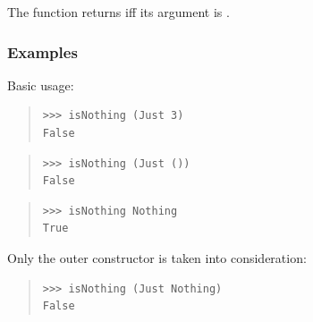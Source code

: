 \begin{haddockdesc}
\item[\begin{tabular}{@{}l}
isNothing :: Maybe a -> Bool
\end{tabular}]
{\haddockbegindoc
The  function returns  iff its argument is .\par
\subsubsection*{\textbf{Examples}}
Basic usage:\par
\begin{quote}
{\haddockverb\begin{verbatim}
>>> isNothing (Just 3)
False

\end{verbatim}}
\end{quote}
\begin{quote}
{\haddockverb\begin{verbatim}
>>> isNothing (Just ())
False

\end{verbatim}}
\end{quote}
\begin{quote}
{\haddockverb\begin{verbatim}
>>> isNothing Nothing
True

\end{verbatim}}
\end{quote}
Only the outer constructor is taken into consideration:\par
\begin{quote}
{\haddockverb\begin{verbatim}
>>> isNothing (Just Nothing)
False

\end{verbatim}}
\end{quote}}
\end{haddockdesc}
